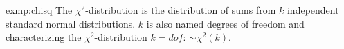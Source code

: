 \begin{exmp}{exmp:chisq}
	The $\chi^2$-distribution is the distribution of sums from $k$ independent standard normal distributions. $k$ is also named degrees of freedom and characterizing the $\chi^2$-distribution $k=dof$: $\sim \chi^2(k)$.
	
\end{exmp}
\pagebreak
